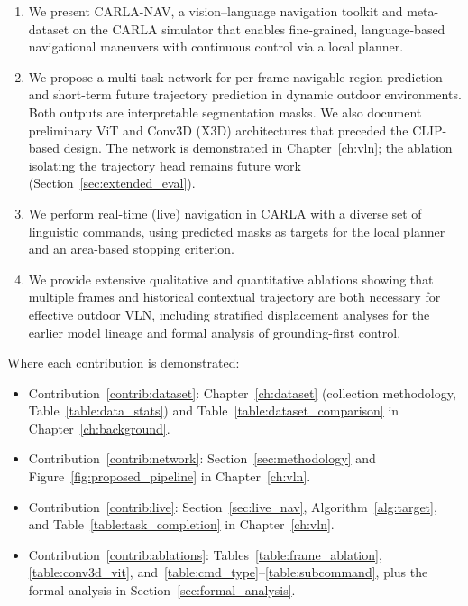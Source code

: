 \begin{enumerate}
    \item\label{contrib:dataset} We present CARLA-NAV, a vision--language navigation toolkit and meta-dataset on the CARLA simulator that enables fine-grained, language-based navigational maneuvers with continuous control via a local planner.
    \item\label{contrib:network} We propose a multi-task network for per-frame navigable-region prediction and short-term future trajectory prediction in dynamic outdoor environments. Both outputs are interpretable segmentation masks. We also document preliminary ViT and Conv3D (X3D) architectures that preceded the CLIP-based design. The network is demonstrated in Chapter~\ref{ch:vln}; the ablation isolating the trajectory head remains future work (Section~\ref{sec:extended_eval}).
    \item\label{contrib:live} We perform real-time (live) navigation in CARLA with a diverse set of linguistic commands, using predicted masks as targets for the local planner and an area-based stopping criterion.
    \item\label{contrib:ablations} We provide extensive qualitative and quantitative ablations showing that multiple frames and historical contextual trajectory are both necessary for effective outdoor VLN, including stratified displacement analyses for the earlier model lineage and formal analysis of grounding-first control.
\end{enumerate}

Where each contribution is demonstrated:
\begin{itemize}
    \item Contribution~\ref{contrib:dataset}: Chapter~\ref{ch:dataset} (collection methodology, Table~\ref{table:data_stats}) and Table~\ref{table:dataset_comparison} in Chapter~\ref{ch:background}.
    \item Contribution~\ref{contrib:network}: Section~\ref{sec:methodology} and Figure~\ref{fig:proposed_pipeline} in Chapter~\ref{ch:vln}.
    \item Contribution~\ref{contrib:live}: Section~\ref{sec:live_nav}, Algorithm~\ref{alg:target}, and Table~\ref{table:task_completion} in Chapter~\ref{ch:vln}.
    \item Contribution~\ref{contrib:ablations}: Tables~\ref{table:frame_ablation}, \ref{table:conv3d_vit}, and~\ref{table:cmd_type}--\ref{table:subcommand}, plus the formal analysis in Section~\ref{sec:formal_analysis}.
\end{itemize}

